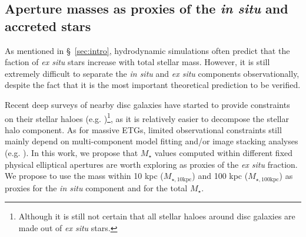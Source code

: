 \documentclass[fleqn,usenatbib]{mnras}
\def\mstar{{$M_{\star}$}}
\def\minn{{$M_{\star,10\mathrm{kpc}}$}}
\def\mtot{{$M_{\star,100\mathrm{kpc}}$}}
\begin{document}
\subsection{Aperture masses as proxies of the \textit{in situ} and accreted stars}
    \label{ssec:insitu}
    
    As mentioned in \S~\ref{sec:intro}, hydrodynamic simulations often predict that 
    the faction of \textit{ex situ} stars increase with total stellar mass.
    However, it is still extremely difficult to separate the \textit{in situ} and
    \textit{ex situ} components observationally, despite the fact that it is the most 
    important theoretical prediction to be verified. 
    
    Recent deep surveys of nearby disc galaxies have started to provide constraints 
    on their stellar haloes (e.g. \citealt{Courteau2011, Merritt2016, 
    Harmsen2017})\footnote{Although it is still not certain that all stellar haloes
    around disc galaxies are made out of \textit{ex situ} stars.}, as it is
    relatively easier to decompose the stellar halo component. 
    As for massive ETGs, limited observational constraints still mainly depend on 
    multi-component model fitting and/or image stacking analyses 
    (e.g. \citealt{Gonzalez2007, Huang2013a, DSouza2014, Spavone2017}).
    In this work, we propose that \mstar{} values computed within different fixed 
    physical elliptical apertures are worth exploring as proxies of the 
    \textit{ex situ} fraction. 
    We propose to use the mass within 10 kpc (\minn{}) and 100 kpc (\mtot{}) as 
    proxies for the \textit{in situ} component and for the total \mstar{}. 
    
\end{document}
